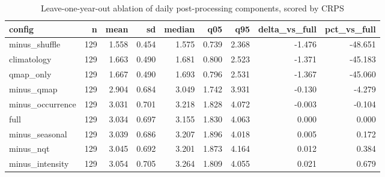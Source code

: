 \begin{table}[t]
\centering
\caption{Leave-one-year-out ablation of daily post-processing components, scored by CRPS}
\label{tab:postproc}
\begin{tabular}{lrrrrrrrr}
\toprule
config & n & mean & sd & median & q05 & q95 & delta\_vs\_full & pct\_vs\_full \\
\midrule
minus\_shuffle & 129 & 1.558 & 0.454 & 1.575 & 0.739 & 2.368 & -1.476 & -48.651 \\
climatology & 129 & 1.663 & 0.490 & 1.681 & 0.800 & 2.523 & -1.371 & -45.183 \\
qmap\_only & 129 & 1.667 & 0.490 & 1.693 & 0.796 & 2.531 & -1.367 & -45.060 \\
minus\_qmap & 129 & 2.904 & 0.684 & 3.049 & 1.742 & 3.931 & -0.130 & -4.279 \\
minus\_occurrence & 129 & 3.031 & 0.701 & 3.218 & 1.828 & 4.072 & -0.003 & -0.104 \\
full & 129 & 3.034 & 0.697 & 3.155 & 1.830 & 4.063 & 0.000 & 0.000 \\
minus\_seasonal & 129 & 3.039 & 0.686 & 3.207 & 1.896 & 4.018 & 0.005 & 0.172 \\
minus\_nqt & 129 & 3.045 & 0.692 & 3.201 & 1.873 & 4.164 & 0.012 & 0.384 \\
minus\_intensity & 129 & 3.054 & 0.705 & 3.264 & 1.809 & 4.055 & 0.021 & 0.679 \\
\bottomrule
\end{tabular}
\end{table}
